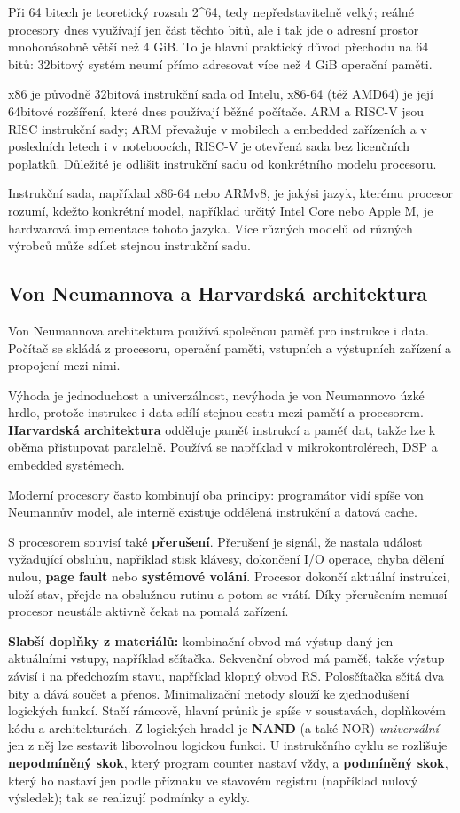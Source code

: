 \documentclass[11pt,a4paper]{article}
\newcommand{\itbox}[1]{\medskip\noindent\colorbox{black!6}{\parbox{\dimexpr\linewidth-2\fboxsep}{#1}}\medskip}
\begin{document}
Při 64 bitech je teoretický rozsah 2\textasciicircum{}64, tedy nepředstavitelně velký; reálné procesory dnes využívají jen část těchto bitů, ale i tak jde o adresní prostor mnohonásobně větší než 4 GiB. To je hlavní praktický důvod přechodu na 64 bitů: 32bitový systém neumí přímo adresovat více než 4 GiB operační paměti.

x86 je původně 32bitová instrukční sada od Intelu, x86-64 (též AMD64) je její 64bitové rozšíření, které dnes používají běžné počítače. ARM a RISC-V jsou RISC instrukční sady; ARM převažuje v mobilech a embedded zařízeních a v posledních letech i v noteboocích, RISC-V je otevřená sada bez licenčních poplatků. Důležité je odlišit instrukční sadu od konkrétního modelu procesoru.

Instrukční sada, například x86-64 nebo ARMv8, je jakýsi jazyk, kterému procesor rozumí, kdežto konkrétní model, například určitý Intel Core nebo Apple M, je hardwarová implementace tohoto jazyka. Více různých modelů od různých výrobců může sdílet stejnou instrukční sadu.

\subsection*{Von Neumannova a Harvardská architektura}

Von Neumannova architektura používá společnou paměť pro instrukce i data. Počítač se skládá z procesoru, operační paměti, vstupních a výstupních zařízení a propojení mezi nimi.

Výhoda je jednoduchost a univerzálnost, nevýhoda je von Neumannovo úzké hrdlo, protože instrukce i data sdílí stejnou cestu mezi pamětí a procesorem. \textbf{Harvardská architektura} odděluje paměť instrukcí a paměť dat, takže lze k oběma přistupovat paralelně. Používá se například v mikrokontrolérech, DSP a embedded systémech.

Moderní procesory často kombinují oba principy: programátor vidí spíše von Neumannův model, ale interně existuje oddělená instrukční a datová cache.

S procesorem souvisí také \textbf{přerušení}. Přerušení je signál, že nastala událost vyžadující obsluhu, například stisk klávesy, dokončení I/O operace, chyba dělení nulou, \textbf{page fault} nebo \textbf{systémové volání}. Procesor dokončí aktuální instrukci, uloží stav, přejde na obslužnou rutinu a potom se vrátí. Díky přerušením nemusí procesor neustále aktivně čekat na pomalá zařízení.

\itbox{\textbf{Slabší doplňky z materiálů:} kombinační obvod má výstup daný jen aktuálními vstupy, například sčítačka. Sekvenční obvod má paměť, takže výstup závisí i na předchozím stavu, například klopný obvod RS. Polosčítačka sčítá dva bity a dává součet a přenos. Minimalizační metody slouží ke zjednodušení logických funkcí. Stačí rámcově, hlavní průnik je spíše v soustavách, doplňkovém kódu a architekturách. Z logických hradel je \textbf{NAND} (a také NOR) \emph{univerzální} -- jen z něj lze sestavit libovolnou logickou funkci. U instrukčního cyklu se rozlišuje \textbf{nepodmíněný skok}, který program counter nastaví vždy, a \textbf{podmíněný skok}, který ho nastaví jen podle příznaku ve stavovém registru (například nulový výsledek); tak se realizují podmínky a cykly.}
\end{document}

